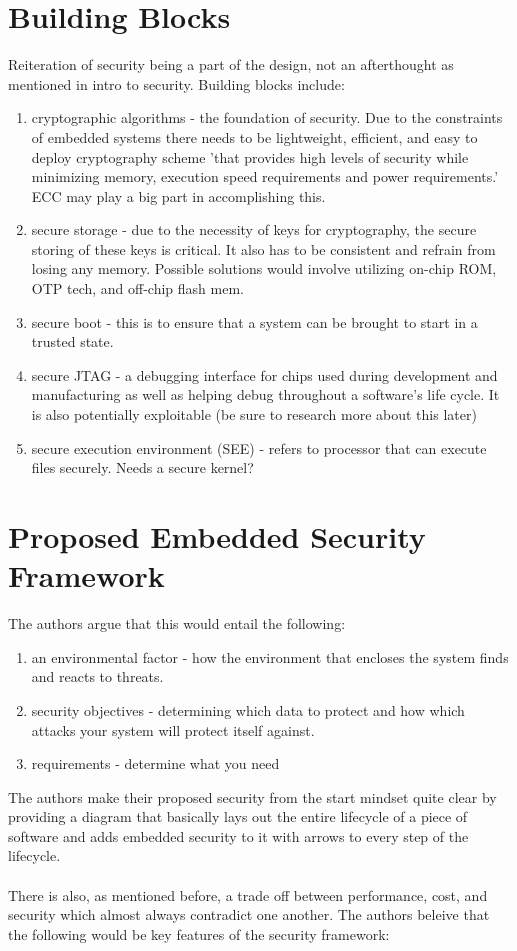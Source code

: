 \documentclass{article}
\begin{document}
\begin{enumerate}
\section*{Building Blocks}
Reiteration of security being a part of the design, not an afterthought as mentioned in intro to security. Building blocks include:
\begin{enumerate}
\item cryptographic algorithms - the foundation of security. Due to the constraints of embedded systems there needs to be lightweight, efficient, and easy to deploy cryptography scheme 'that provides high levels of security while minimizing memory, execution speed requirements and power requirements.' ECC may play a big part in accomplishing this. 
\item secure storage - due to the necessity of keys for cryptography, the secure storing of these keys is critical. It also has to be consistent and refrain from losing any memory. Possible solutions would involve utilizing on-chip ROM, OTP tech, and off-chip flash mem.
\item secure boot - this is to ensure that a system can be brought to start in a trusted state.
\item secure JTAG - a debugging interface for chips used during development and manufacturing as well as helping debug throughout a software's life cycle. It is also potentially exploitable (be sure to research more about this later)
\item secure execution environment (SEE) - refers to processor that can execute files securely. Needs a secure kernel?
\end{enumerate}

\section*{Proposed Embedded Security Framework}
The authors argue that this would entail the following:
\begin{enumerate}
\item an environmental factor - how the environment that encloses the system finds and reacts to threats.
\item security objectives - determining which data to protect and how which attacks your system will protect itself against. 
\item requirements - determine what you need
\end{enumerate}

The authors make their proposed security from the start mindset quite clear by providing a diagram that basically lays out the entire lifecycle of a piece of software and adds embedded security to it with arrows to every step of the lifecycle. 
\\
\\ There is also, as mentioned before, a trade off between performance, cost, and security which almost always contradict one another. The authors beleive that the following would be key features of the security framework:


\end{enumerate}
\end{document}
